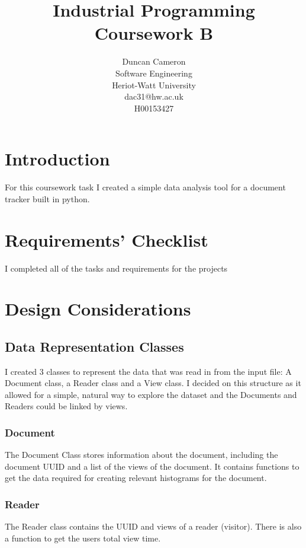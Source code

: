 \documentclass[11pt]{report}
\begin{document}
\title{Industrial Programming Coursework B}
\author{Duncan Cameron \\
Software Engineering \\
Heriot-Watt University \\
dac31@hw.ac.uk\\
H00153427}
\maketitle



\chapter{Introduction}

For this coursework task I created a simple data analysis tool for a document tracker built in python.



\chapter{Requirements' Checklist}

I completed all of the tasks and requirements for the projects


\chapter{Design Considerations}
\section{Data Representation Classes}
I created 3 classes to represent the data that was read in from the input file: A Document class, a Reader class and a View class.  I decided on this structure as it allowed for a simple, natural way to explore the dataset and the Documents and Readers could be linked by views.

\subsection{Document}
The Document Class stores information about the document, including the document UUID and a list of the views of the document.  It contains functions to get the data required for creating relevant histograms for the document.

\subsection{Reader}
The Reader class contains the UUID and views of a reader (visitor).  There is also a function to get the users total view time.
\end{document}
